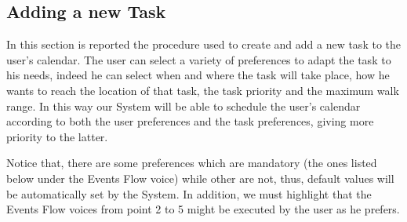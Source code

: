 \subsection{Adding a new Task}
In this section is reported the procedure used to create and add a new task to the user's calendar.
The user can select a variety of preferences to adapt the task to his needs, indeed he can select when and where the task will take place, how he wants to reach the location of that task, the task priority and the maximum walk range. In this way our System will be able to schedule the user's calendar according to both the user preferences and the task preferences, giving more priority to the latter.

Notice that, there are some preferences which are mandatory (the ones listed below under the Events Flow voice) while other are not, thus, default values will be automatically set by the System. In addition, we must highlight that the Events Flow voices from point 2 to 5 might be executed by the user as he prefers.

